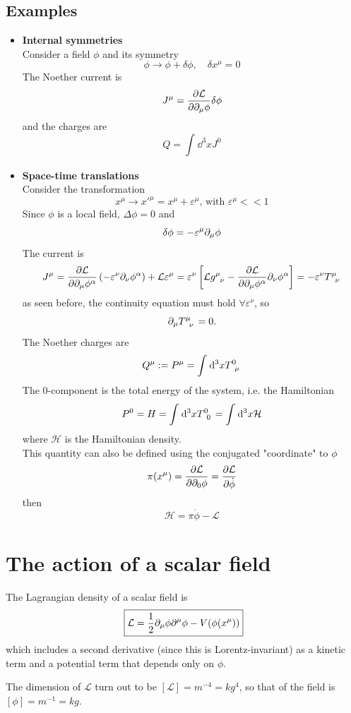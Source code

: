 \subsection{Examples}
\begin{itemize}
    \item \textbf{Internal symmetries}\\
Consider a field $\phi$ and its symmetry
$$\phi\rightarrow\phi+\delta\phi,\quad\delta x^\mu=0$$
The Noether current is
$$J^\mu=\pdv{\mathcal{L}}{\partial_\mu\phi}\delta\phi$$
and the charges are
$$Q = \int_{}^{}\dd^3 x J^0$$
\item \textbf{Space-time translations}\\
    Consider the transformation
$$x^\mu\rightarrow x'^\mu = x^\mu+\varepsilon^\mu\text{, with }\varepsilon^\mu<<1$$
Since $\phi$ is a local field, $\Delta\phi= 0$ and
$$\delta\phi = -\varepsilon^\mu\partial_\mu\phi$$
The current is
$$J^\mu = \pdv{\mathcal{L}}{\pd_\mu\phi^\alpha}\left(-\varepsilon^\nu\pd_\nu
\phi^\alpha\right) + \mathcal{L}\varepsilon^\mu = \varepsilon^\nu\left[\mathcal{L}
g\indices{^\mu_\nu}-\pdv{\mathcal{L}}{\pd_\mu\phi^\alpha}\pd_\nu\phi^\alpha\right]=
-\varepsilon^\nu T\indices{^\mu_\nu}$$
as seen before, the continuity equation must hold $\forall \varepsilon^\nu$, so
$$\pd_\mu T\indices{^\mu_\nu} = 0.$$
The Noether charges are
$$Q^\mu:=P^\mu = \int_{}^{}\dd^3 x T\indices{^0_\mu}$$
The 0-component is the total energy of the system, i.e. the Hamiltonian
$$P^0 = H = \int_{}^{}\dd^3x T\indices{^0_0} = \int_{}^{}\dd^3x\mathcal{H}$$
where $\mathcal{H}$ is the Hamiltonian density.\\
This quantity can also be defined using the conjugated "coordinate" to $\phi$
$$\pi(x^\mu) = \pdv{\mathcal{L}}{\partial_0\phi} = \pdv{\mathcal{L}}{\dot \phi}$$
then
$$\mathcal{H} = \pi\dot\phi-\mathcal{L}$$
\end{itemize}
\section{The action of a scalar field}
The Lagrangian density of a scalar field is
$$\boxed{\mathcal{L} = \frac{1}{2}\partial_\mu\phi\partial^\mu\phi - V(\phi(x^\mu))}$$
which includes a second derivative (since this is Lorentz-invariant) as a kinetic
term and a potential term that depends only on $\phi$.

The dimension of $\mathcal{L}$ turn out to be $[\mathcal{L}] = m^{-4}=kg^4$, so
that of the field is $[\phi] = m^{-1} = kg$.

